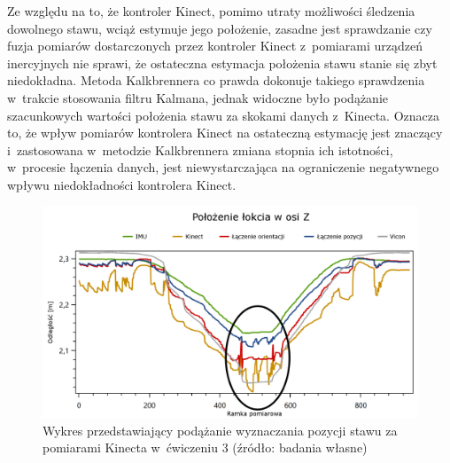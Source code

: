 Ze względu na to, że kontroler Kinect, pomimo utraty możliwości śledzenia dowolnego stawu, wciąż estymuje jego położenie, zasadne jest sprawdzanie czy fuzja pomiarów dostarczonych przez kontroler Kinect z~pomiarami urządzeń inercyjnych nie sprawi, że ostateczna estymacja położenia stawu stanie się zbyt niedokładna. Metoda Kalkbrennera co prawda dokonuje takiego sprawdzenia w~trakcie stosowania filtru Kalmana, jednak widoczne było podążanie szacunkowych wartości położenia stawu za skokami danych z~Kinecta. Oznacza to, że wpływ pomiarów kontrolera Kinect na ostateczną estymację jest znaczący i~zastosowana w~metodzie Kalkbrennera zmiana stopnia ich istotności, w~procesie łączenia danych, jest niewystarczająca na ograniczenie negatywnego wpływu niedokładności kontrolera Kinect.
														
\begin{savenotes}
	\begin{figure}[!htb]
		\centering
		\includegraphics[width=\textwidth]{images/300/Slide3_focus.png}
		\caption{Wykres przedstawiający podążanie wyznaczania pozycji stawu za pomiarami Kinecta w~ćwiczeniu 3 (źródło: badania własne)}
		\label{fig:experiments:sec:follow}
	\end{figure}
\end{savenotes}
																
